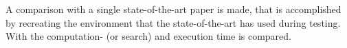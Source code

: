 A comparison with a single state-of-the-art paper is made, that is accomplished by recreating the environment that the state-of-the-art has used during testing. With \citeauthor{wang_affordancebased_2020} the computation- (or search) and execution time is compared.\bs







